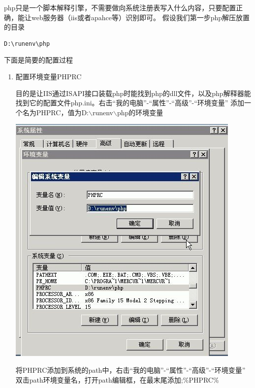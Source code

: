\documentclass{article}
\begin{document}
php只是一个脚本解释引擎，不需要做向系统注册表写入什么内容，只要配置正确，能让web服务器（iis或者apahce等）识别即可。
假设我们第一步php解压放置的目录

\begin{verbatim}
D:\runenv\php
\end{verbatim}
下面是简要的配置过程

\begin{enumerate}
\item 配置环境变量PHPRC

目的是让IIS通过ISAPI接口装载php时能找到php的dll文件，以及php解释器能找到它的配置文件php.ini。右击“我的电脑”-“属性”-“高级”-“环境变量” 添加一个名为PHPRC，值为D:$\backslash$runenv$\backslash$php的环境变量

\includegraphics{img/install/windows/apache/1.jpg}

将PHPRC添加到系统的path中，右击“我的电脑”-“属性”-“高级”-“环境变量” 双击path环境变量名，打开path编辑框，在最末尾添加;\%PHPRC\%


\end{enumerate}
\end{document}
